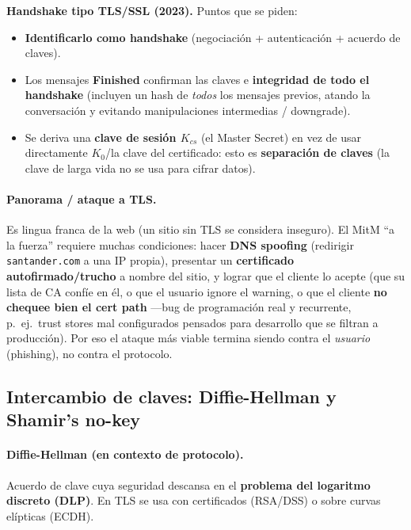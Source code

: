 \documentclass[../main.tex]{subfiles}
\begin{document}
\begin{examen}
\textbf{Handshake tipo TLS/SSL (2023).} Puntos que se piden:
\begin{itemize}[leftmargin=1.3em]
  \item \textbf{Identificarlo como handshake} (negociación + autenticación + acuerdo
  de claves).
  \item Los mensajes \textbf{Finished} confirman las claves e \textbf{integridad de
  todo el handshake} (incluyen un hash de \emph{todos} los mensajes previos, atando
  la conversación y evitando manipulaciones intermedias / downgrade).
  \item Se deriva una \textbf{clave de sesión $K_{cs}$} (el Master Secret) en vez de
  usar directamente $K_0$/la clave del certificado: esto es
  \textbf{separación de claves} (la clave de larga vida no se usa para cifrar datos).
\end{itemize}
\end{examen}

\paragraph{Panorama / ataque a TLS.} Es lingua franca de la web (un sitio sin TLS se
considera inseguro). El MitM ``a la fuerza'' requiere muchas condiciones: hacer
\textbf{DNS spoofing} (redirigir \texttt{santander.com} a una IP propia), presentar
un \textbf{certificado autofirmado/trucho} a nombre del sitio, y lograr que el
cliente lo acepte (que su lista de CA confíe en él, o que el usuario ignore el
warning, o que el cliente \textbf{no chequee bien el cert path} —bug de programación
real y recurrente, p.\ ej.\ trust stores mal configurados pensados para desarrollo
que se filtran a producción). Por eso el ataque más viable termina siendo contra el
\emph{usuario} (phishing), no contra el protocolo.

\subsection{Intercambio de claves: Diffie-Hellman y Shamir's no-key}

\paragraph{Diffie-Hellman (en contexto de protocolo).} Acuerdo de clave cuya
seguridad descansa en el \textbf{problema del logaritmo discreto (DLP)}. En TLS se
usa con certificados (RSA/DSS) o sobre curvas elípticas (ECDH).
\end{document}
